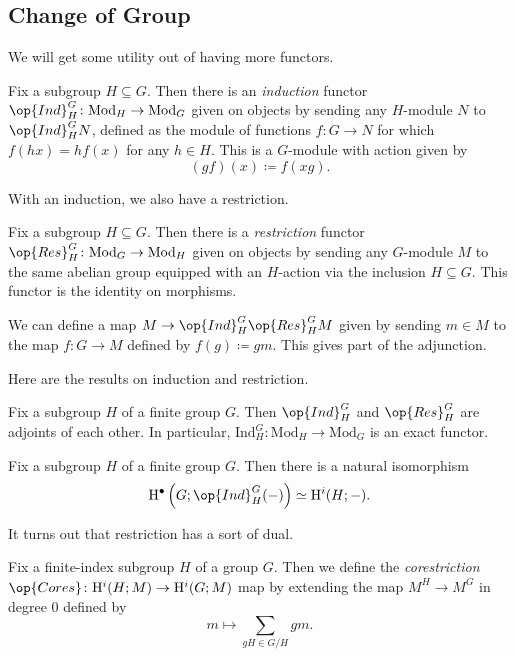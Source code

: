 \documentclass[../notes.tex]{subfiles}
\begin{document}
\subsection{Change of Group}
We will get some utility out of having more functors.
\begin{definition}[induction]
	Fix a subgroup $H\subseteq G$. Then there is an \textit{induction} functor $\op{Ind}_H^G\colon\mathrm{Mod}_H\to\mathrm{Mod}_G$ given on objects by sending any $H$-module $N$ to $\op{Ind}_H^GN$, defined as the module of functions $f\colon G\to N$ for which $f(hx)=hf(x)$ for any $h\in H$. This is a $G$-module with action given by
	\[(gf)(x)\coloneqq f(xg).\]
\end{definition}
With an induction, we also have a restriction.
\begin{definition}[restriction]
	Fix a subgroup $H\subseteq G$. Then there is a \textit{restriction} functor $\op{Res}^G_H\colon\mathrm{Mod}_G\to\mathrm{Mod}_H$ given on objects by sending any $G$-module $M$ to the same abelian group equipped with an $H$-action via the inclusion $H\subseteq G$. This functor is the identity on morphisms.
\end{definition}
\begin{remark}
	We can define a map $M\to\op{Ind}_H^G\op{Res}_H^GM$ given by sending $m\in M$ to the map $f\colon G\to M$ defined by $f(g)\coloneqq gm$. This gives part of the adjunction.
\end{remark}
Here are the results on induction and restriction.
\begin{proposition}
	Fix a subgroup $H$ of a finite group $G$. Then $\op{Ind}_H^G$ and $\op{Res}^G_H$ are adjoints of each other. In particular, $\mathrm{Ind}_H^G\colon\mathrm{Mod}_H\to\mathrm{Mod}_G$ is an exact functor.
\end{proposition}
\begin{proposition}
	Fix a subgroup $H$ of a finite group $G$. Then there is a natural isomorphism
	\[\mathrm H^\bullet\left(G;\op{Ind}_H^G(-)\right)\simeq\mathrm H^i(H;-).\]
\end{proposition}
It turns out that restriction has a sort of dual.
\begin{definition}[corestriction]
	Fix a finite-index subgroup $H$ of a group $G$. Then we define the \textit{corestriction} $\op{Cores}\colon\mathrm H^i(H;M)\to\mathrm H^i(G;M)$ map by extending the map $M^H\to M^G$ in degree $0$ defined by
	\[m\mapsto\sum_{gH\in G/H}gm.\]
\end{definition}
\end{document}

